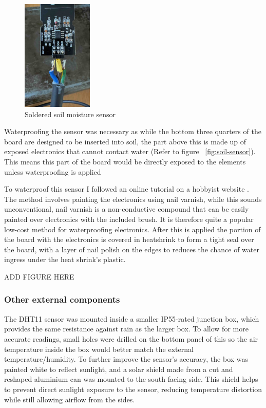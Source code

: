 \begin{figure}[H]
    \centering
    \includegraphics[width=0.3\textwidth]{contents/23-hw-development/23-fig/solder-soil.jpeg}
    \caption{Soldered soil moisture sensor}
    \label{fig:solder-soil}
\end{figure}

Waterproofing the sensor was necessary as while the bottom three quarters of the
board are designed to be inserted into soil, the part above this is made up of
exposed electronics that cannot contact water (Refer to figure
~\ref{fig:soil-sensor}). This means this part of the board would be directly
exposed to the elements unless waterproofing is applied

To waterproof this sensor I followed an online tutorial on a hobbyist website
\cite{waterproof-sensor}. The method involves painting the electronics using
nail varnish, while this sounds unconventional, nail varnish is a non-conductive
compound that can be easily painted over electronics with the included brush. It
is therefore quite a popular low-cost method for waterproofing electronics.
After this is applied the portion of the board with the electronics is covered
in heatshrink to form a tight seal over the board, with a layer of nail polish
on the edges to reduces the chance of water ingress under the heat shrink's
plastic.

ADD FIGURE HERE

\subsubsection{Other external components}

The DHT11 sensor was mounted inside a smaller IP55-rated junction box, which
provides the same resistance against rain as the larger box. To allow for more
accurate readings, small holes were drilled on the bottom panel of this so the
air temperature inside the box would better match the external
temperature/humidity. To further improve the sensor's accuracy, the box was
painted white to reflect sunlight, and a solar shield made from a cut and
reshaped aluminium can was mounted to the south facing side. This shield helps
to prevent direct sunlight exposure to the sensor, reducing temperature
distortion while still allowing airflow from the sides.

